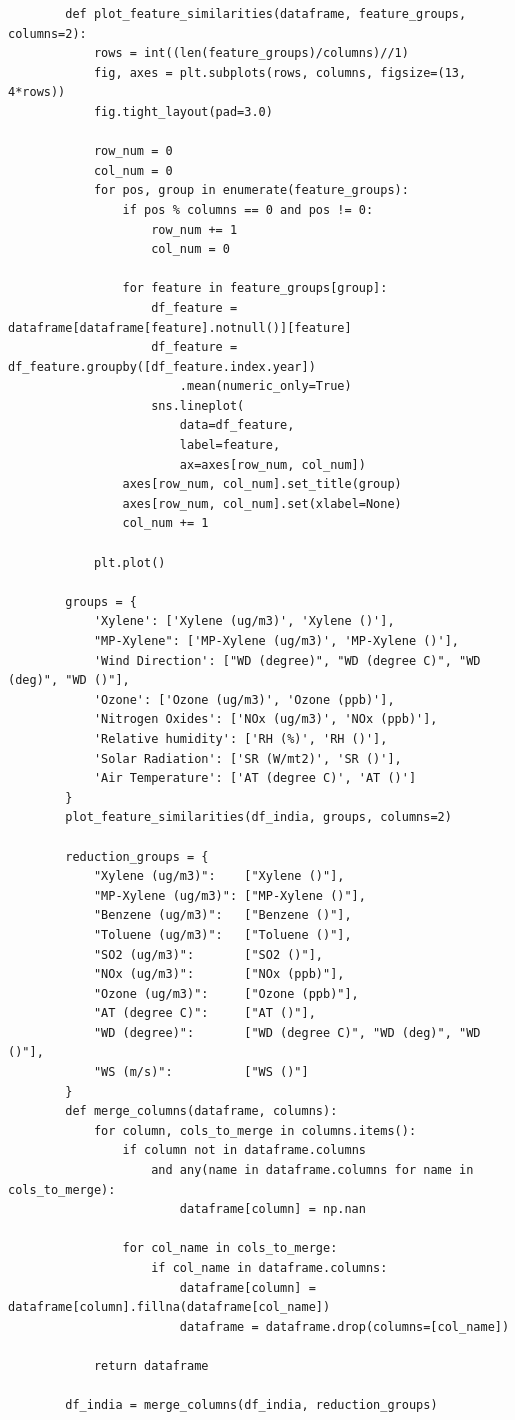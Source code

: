 \documentclass[a4paper,12pt]{report}
\begin{document}
	\begin{verbatim}
		def plot_feature_similarities(dataframe, feature_groups, columns=2):
			rows = int((len(feature_groups)/columns)//1)
			fig, axes = plt.subplots(rows, columns, figsize=(13, 4*rows))
			fig.tight_layout(pad=3.0)
			
			row_num = 0
			col_num = 0
			for pos, group in enumerate(feature_groups):
				if pos % columns == 0 and pos != 0:
					row_num += 1
					col_num = 0
				
				for feature in feature_groups[group]:
					df_feature = dataframe[dataframe[feature].notnull()][feature]
					df_feature = df_feature.groupby([df_feature.index.year])
						.mean(numeric_only=True)
					sns.lineplot(
						data=df_feature, 
						label=feature, 
						ax=axes[row_num, col_num])
				axes[row_num, col_num].set_title(group)
				axes[row_num, col_num].set(xlabel=None)
				col_num += 1
			
			plt.plot()
		
		groups = {
			'Xylene': ['Xylene (ug/m3)', 'Xylene ()'],
			"MP-Xylene": ['MP-Xylene (ug/m3)', 'MP-Xylene ()'],
			'Wind Direction': ["WD (degree)", "WD (degree C)", "WD (deg)", "WD ()"],
			'Ozone': ['Ozone (ug/m3)', 'Ozone (ppb)'],
			'Nitrogen Oxides': ['NOx (ug/m3)', 'NOx (ppb)'],
			'Relative humidity': ['RH (%)', 'RH ()'],
			'Solar Radiation': ['SR (W/mt2)', 'SR ()'],
			'Air Temperature': ['AT (degree C)', 'AT ()']
		}
		plot_feature_similarities(df_india, groups, columns=2)
		
		reduction_groups = {
			"Xylene (ug/m3)":    ["Xylene ()"],
			"MP-Xylene (ug/m3)": ["MP-Xylene ()"],
			"Benzene (ug/m3)":   ["Benzene ()"],
			"Toluene (ug/m3)":   ["Toluene ()"],
			"SO2 (ug/m3)":       ["SO2 ()"],
			"NOx (ug/m3)":       ["NOx (ppb)"],
			"Ozone (ug/m3)":     ["Ozone (ppb)"],
			"AT (degree C)":     ["AT ()"],
			"WD (degree)":       ["WD (degree C)", "WD (deg)", "WD ()"],
			"WS (m/s)":          ["WS ()"]
		}
		def merge_columns(dataframe, columns):
			for column, cols_to_merge in columns.items():
				if column not in dataframe.columns 
					and any(name in dataframe.columns for name in cols_to_merge):
						dataframe[column] = np.nan
			
				for col_name in cols_to_merge:
					if col_name in dataframe.columns:
						dataframe[column] = dataframe[column].fillna(dataframe[col_name])
						dataframe = dataframe.drop(columns=[col_name])
			
			return dataframe
			
		df_india = merge_columns(df_india, reduction_groups)
	\end{verbatim}
	
\end{document}
